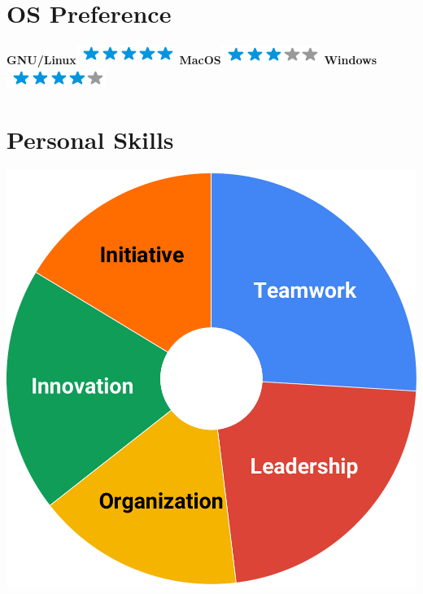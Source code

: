 \documentclass[]{friggeri-cv}
\begin{document}
\begin{aside}
  \section{OS Preference}
    \textbf{GNU/Linux}\includegraphics[scale=0.40]{img/5stars.png}
    \textbf{MacOS}\includegraphics[scale=0.40]{img/3stars.png}
    \textbf{Windows}\includegraphics[scale=0.40]{img/4stars.png}
    ~
  \section{Personal Skills}
    \includegraphics[scale=0.2]{img/skills.pdf}
    ~
\end{aside}
\end{document}
